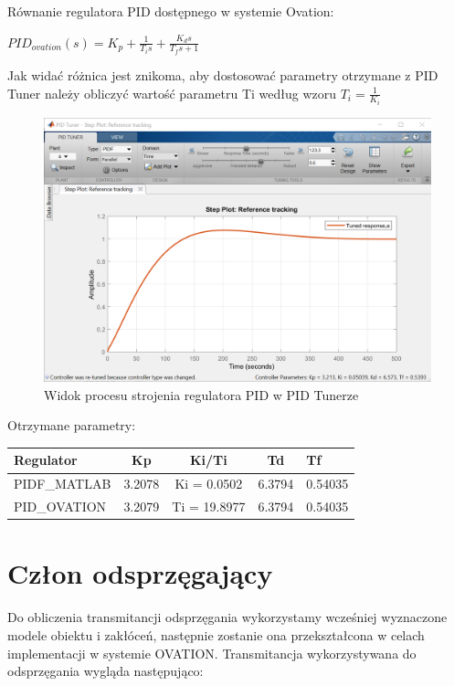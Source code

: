 \documentclass{mwrep}
\begin{document}
Równanie regulatora PID dostępnego w systemie Ovation:
\vspace{2mm}

$PID_{ovation}(s) = K _ { p } + \frac { 1 } {  T _ { i } s } + \frac { K _ { d } s } { T _ { f } s + 1 }$
\vspace{3mm}

Jak widać różnica jest znikoma, aby dostosować parametry otrzymane z PID Tuner należy obliczyć wartość parametru Ti według wzoru $T_{i} = \frac{1}{K_{i}}$

\begin{figure}[H]
\centering
\includegraphics[scale=0.4]{materialy/krystian_plots/pid_tuner.png}
\caption{Widok procesu strojenia regulatora PID w PID Tunerze}
\end{figure}

Otrzymane parametry:

\begin{table}[H]
\begin{tabular}{l|cccl}
Regulator    & Kp     & Ki/Ti        & Td     & Tf      \\ \hline
PIDF\_MATLAB & 3.2078 & Ki = 0.0502  & 6.3794 & 0.54035 \\
PID\_OVATION & 3.2079 & Ti = 19.8977 & 6.3794 & 0.54035
\end{tabular}
\end{table}
\newpage
\section{Człon odsprzęgający}
\label{Odsprzeganie}
Do obliczenia transmitancji odsprzęgania wykorzystamy wcześniej wyznaczone modele obiektu i zakłóceń, następnie zostanie ona przekształcona w celach implementacji w systemie OVATION.
Transmitancja wykorzystywana do odsprzęgania wygląda następująco:
\end{document}
